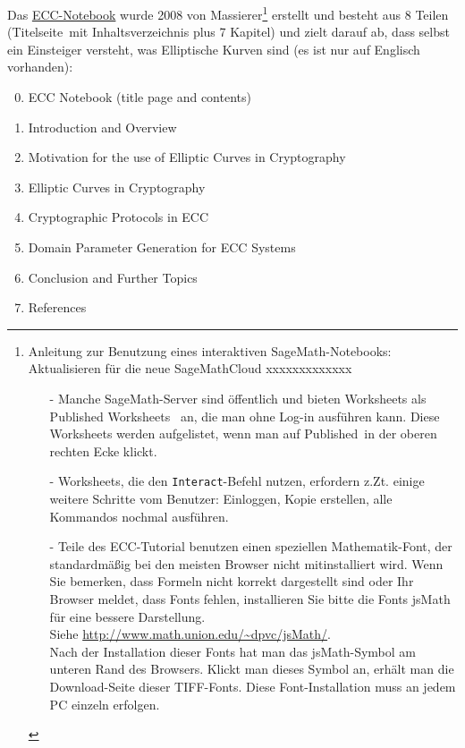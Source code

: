\begin{refsegment}
Das \hyperlink{ec:Web-Link:Sage_Massierer}{ECC-Notebook}
wurde 2008 von Massierer\footnote{%
Anleitung zur Benutzung eines interaktiven SageMath-Notebooks:
Aktualisieren für die neue SageMathCloud xxxxxxxxxxxxx\\
\begin{itemize}
  \item[-] Manche SageMath-Server sind öffentlich
  und bieten Worksheets als
  \glqq Published Worksheets\grqq~ an, die man ohne Log-in
  ausführen kann. Diese Worksheets werden aufgelistet, wenn man
  auf \glqq Published\grqq~in der oberen rechten Ecke klickt.
  \item[-] Worksheets, die den  \verb#Interact#-Befehl nutzen, erfordern z.Zt.
  einige weitere Schritte vom Benutzer: Einloggen, Kopie erstellen,
  alle Kommandos nochmal ausführen.\\
\item[-]
  Teile des ECC-Tutorial benutzen einen speziellen Mathematik-Font, der standardmäßig
  bei den meisten Browser nicht mitinstalliert wird. Wenn Sie bemerken, dass Formeln
  nicht korrekt dargestellt sind oder Ihr Browser meldet, dass Fonts fehlen,
  installieren Sie bitte die Fonts jsMath für eine bessere Darstellung.\\
  Siehe \url{http://www.math.union.edu/~dpvc/jsMath/}.\\
  Nach der Installation dieser Fonts hat man das jsMath-Symbol am unteren Rand
  des Browsers. Klickt man dieses Symbol an, erhält man die Download-Seite dieser
  TIFF-Fonts. Diese Font-Installation muss an jedem PC einzeln erfolgen.
\end{itemize}
}
erstellt und besteht aus 8 Teilen (\glqq Titelseite\grqq~mit Inhaltsverzeichnis
plus 7 Kapitel) und zielt darauf ab, dass selbst ein Einsteiger versteht, was
Elliptische Kurven sind (es ist nur auf Englisch vorhanden):
\begin{enumerate}
   \setcounter{enumi}{-1}
   \item ECC Notebook (title page and contents)
   \item Introduction and Overview
   \item Motivation for the use of Elliptic Curves in Cryptography
   \item Elliptic Curves in Cryptography
   \item Cryptographic Protocols in ECC
   \item Domain Parameter Generation for ECC Systems
   \item Conclusion and Further Topics
   \item References
\end{enumerate}



\end{refsegment}
